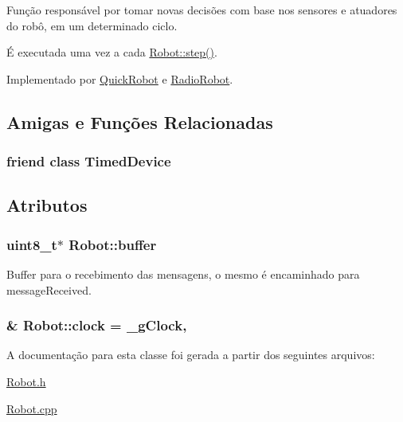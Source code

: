 Função responsável por tomar novas decisões com base nos sensores e atuadores do robô, em um determinado ciclo. 

É executada uma vez a cada \hyperlink{classRobot_aa50d73cd1109a70133af442674ed3a1a}{Robot\-::step()}. 

Implementado por \hyperlink{classQuickRobot_a936a04970e2fe8694256a70816b697f6}{Quick\-Robot} e \hyperlink{classRadioRobot_a7b58f55a81e816ba5d53fd14bf28a6a5}{Radio\-Robot}.



\subsection{Amigas e Funções Relacionadas}
\hypertarget{classRobot_a59d051cd870745df59aefaa2cda15b8a}{
\subsubsection[{Timed\-Device}]{\setlength{\rightskip}{0pt plus 5cm}friend class {\bf Timed\-Device}\hspace{0.3cm}{\ttfamily [friend]}}}\label{classRobot_a59d051cd870745df59aefaa2cda15b8a}


\subsection{Atributos}
\hypertarget{classRobot_aef6f636eb10e6b4998a3b1859ca71500}{
\subsubsection[{buffer}]{\setlength{\rightskip}{0pt plus 5cm}uint8\-\_\-t$\ast$ Robot\-::buffer\hspace{0.3cm}{\ttfamily [protected]}}}\label{classRobot_aef6f636eb10e6b4998a3b1859ca71500}


Buffer para o recebimento das mensagens, o mesmo é encaminhado para {\ttfamily message\-Received}. 

\hypertarget{classRobot_a9bc655119fd6d2864c6aca60403c282d}{
\subsubsection[{clock}]{ \& Robot\-::clock = {\bf \-\_\-g\-Clock}\hspace{0.3cm}{\ttfamily [static]}, {\ttfamily [protected]}}}\label{classRobot_a9bc655119fd6d2864c6aca60403c282d}


A documentação para esta classe foi gerada a partir dos seguintes arquivos\-:\begin{DoxyCompactItemize}
\item 
\hyperlink{Robot_8h}{Robot.\-h}\item 
\hyperlink{Robot_8cpp}{Robot.\-cpp}\end{DoxyCompactItemize}
